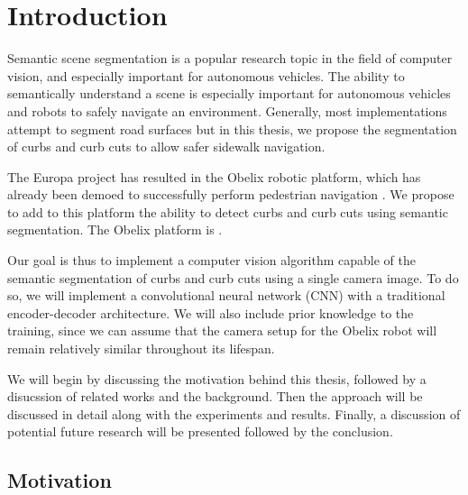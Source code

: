 \chapter{Introduction}\label{chap:introduction}
Semantic scene segmentation is a popular research topic in the field of computer vision, and especially important for autonomous vehicles.
The ability to semantically understand a scene is especially important for autonomous vehicles and robots to safely navigate an environment.
Generally, most implementations attempt to segment road surfaces but in this thesis, we propose the segmentation of curbs and curb cuts to allow safer sidewalk navigation.

The Europa project has resulted in the Obelix robotic platform, which has already been demoed to successfully perform pedestrian navigation \cite{europa}\cite{obelix-slam}.
We propose to add to this platform the ability to detect curbs and curb cuts using semantic segmentation.
The Obelix platform is .


Our goal is thus to implement a computer vision algorithm capable of the semantic segmentation of curbs and curb cuts using a single camera image.
To do so, we will implement a convolutional neural network (CNN) with a traditional encoder-decoder architecture.
We will also include prior knowledge to the training, since we can assume that the camera setup for the Obelix robot will remain relatively similar throughout its lifespan.

We will begin by discussing the motivation behind this thesis, followed by a disucssion of related works and the background.
Then the approach will be discussed in detail along with the experiments and results.
Finally, a discussion of potential future research will be presented followed by the conclusion.

\section{Motivation}
